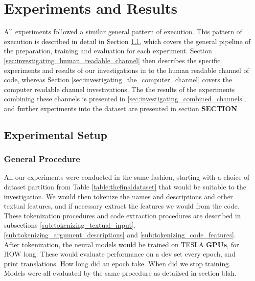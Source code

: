 \chapter{Experiments and Results}
\label{experiments_and_results}


All experiments followed a similar general pattern of execution. 
This pattern of execution is described in detail in Section \ref{sec:experimental_setup}, which covers the general pipeline of the preparation, training and evaluation for each experiment.
Section \ref{sec:investigating_human_readable_channel} then describes the specific experiments and results of our investigations in to the human readable channel of code, whereas Section \ref{sec:investigating_the_computer_channel} covers the computer readable channel investivations.
The the results of the experiments combining these channels is presented in \ref{sec:investigating_combined_channels}, and further experiments into the dataset are presented in section \textbf{SECTION}


\section{Experimental Setup} %
\label{sec:experimental_setup}

\subsection{General Procedure} %
\label{sub:general_procedure}


All our experiments were conducted in the same fashion, starting with a choice of dataset partition from Table \ref{table:thefinaldataset} that would be suitable to the investigation.
We would then tokenize the names and descriptions and other textual features, and if necessary extract the features we would from the code. 
These tokenization procedures and code extraction procedures are described in subsections \ref{sub:tokenizing_textual_input}, \ref{sub:tokenizing_argument_descriptions} and \ref{sub:tokenizing_code_features}.
After tokenization, the neural models would be trained on TESLA \textbf{GPUs}, for HOW long. 
These would evaluate performance on a dev set every epoch, and print translations.
How long did an epoch take.
When did we stop training.
Models were all evaluated by the same procedure as detailsed in section blah. 


